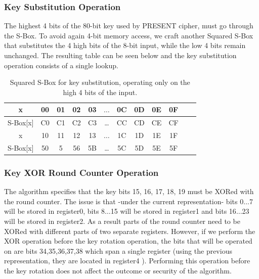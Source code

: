 \documentclass{llncs}
\begin{document}
\subsubsection{Key Substitution Operation}
The highest 4 bits of the 80-bit key used by PRESENT cipher, must go through the S-Box. To avoid again 4-bit memory access, we craft another Squared S-Box that substitutes the 4 high bits of the 8-bit input, while the low 4 bits remain unchanged. The resulting table can be seen below and the key substitution operation consists of a single lookup.

\begin{table}[h]
\centering
\begin{tabular}{| c | c  | c | c | c  | c  | c | c | c  | c | c | c |}
\hline
  x & 00 & 01 & 02 & 03  &  $\dots$  & 0C & 0D & 0E & 0F   \\
\hline
 S-Box[x] & C0 & C1 & C2 & C3 & \dots & CC & CD & CE & CF   \\
\hline
  x & 10 & 11 & 12 & 13  &  $\dots$  & 1C & 1D & 1E & 1F   \\
\hline
 S-Box[x] & 50 & 5 & 56 & 5B & \dots & 5C & 5D & 5E & 5F   \\

\hline
\end{tabular}
 \caption{Squared S-Box for key substitution, operating only on the high 4 bits of the input.}
\end{table}

\subsubsection{Key XOR Round Counter Operation}
The algorithm specifies that the key bits 15, 16, 17, 18, 19 must be XORed with the round counter. The issue is that -under the current representation- bits 0$\dots$7 will be stored in register0, bits 8$\dots$15 will be stored in register1 and bits 16$\dots$23 will be stored in register2. As a result parts of the round counter need to be XORed with different parts of two separate registers. However, if we perform the XOR operation before the key rotation operation, the bits that will be operated on are bits 34,35,36,37,38 which span a single register (using the previous representation, they are located in register4 ). Performing this operation before the key rotation does not affect the outcome or security of the algorithm.
\end{document}
